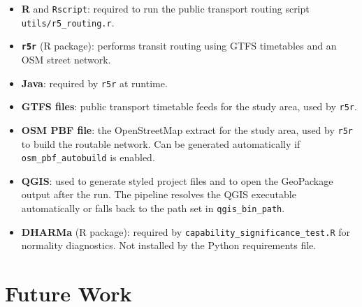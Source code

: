 \documentclass[11pt]{article}
\begin{document}
\begin{itemize}
  \item \textbf{R} and \texttt{Rscript}: required to run the public transport routing script \texttt{utils/r5\_routing.r}.
  \item \textbf{\texttt{r5r}} (R package): performs transit routing using GTFS timetables and an OSM street network.
  \item \textbf{Java}: required by \texttt{r5r} at runtime.
  \item \textbf{GTFS files}: public transport timetable feeds for the study area, used by \texttt{r5r}.
  \item \textbf{OSM PBF file}: the OpenStreetMap extract for the study area, used by \texttt{r5r} to build the routable network. Can be generated automatically if \texttt{osm\_pbf\_autobuild} is enabled.
  \item \textbf{QGIS}: used to generate styled project files and to open the GeoPackage output after the run. The pipeline resolves the QGIS executable automatically or falls back to the path set in \texttt{qgis\_bin\_path}.
  \item \textbf{DHARMa} (R package): required by \texttt{capability\_significance\_test.R} for normality diagnostics. Not installed by the Python requirements file.
\end{itemize}

\section{Future Work}
\end{document}
